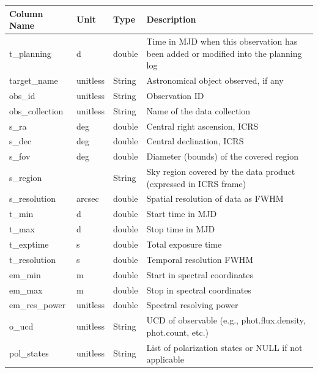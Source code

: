 \documentclass[11pt,a4paper]{ivoa}
\begin{document}
\begin{landscape}
\begin{table}
\begin{tabular}{ |l|l|l|l| }
\hline
\textbf{Column Name} &
\textbf{Unit} &
\textbf{Type} &
\textbf{Description} \\
\hline
t\_planning &
d &
double &
Time in MJD when this observation has been added or modified into the
planning log \\
\hline
target\_name &
unitless &
String &
Astronomical object observed, if any \\
\hline
obs\_id &
unitless &
String &
Observation ID \\
\hline
obs\_collection &
unitless &
String &
Name of the data collection \\
\hline
s\_ra &
deg &
double &
Central right ascension, ICRS \\
\hline
s\_dec &
deg  &
double &
Central declination, ICRS \\
\hline
s\_fov  &
deg &
double &
Diameter (bounds) of the covered region \\
\hline
s\_region &
&
String &
Sky region covered by the data product (expressed in ICRS frame) \\
\hline
s\_resolution &
arcsec &
double &
Spatial resolution of data as FWHM \\
\hline
t\_min &
d &
double &
Start time in MJD \\
\hline
t\_max &
d &
double &
Stop time in MJD \\
\hline
t\_exptime &
s &
double &
Total exposure time \\
\hline
t\_resolution &
s &
double &
Temporal resolution FWHM \\
\hline
em\_min &
m &
double &
Start in spectral coordinates \\
\hline
em\_max &
m &
double &
Stop in spectral coordinates \\
\hline
em\_res\_power &
unitless &
double &
Spectral resolving power \\
\hline
o\_ucd &
unitless &
String &
UCD of observable (e.g., phot.flux.density, phot.count, etc.) \\
\hline
pol\_states &
unitless &
String &
List of polarization states or NULL if not applicable \\

\end{tabular}
\end{table}
\end{landscape}
\end{document}
